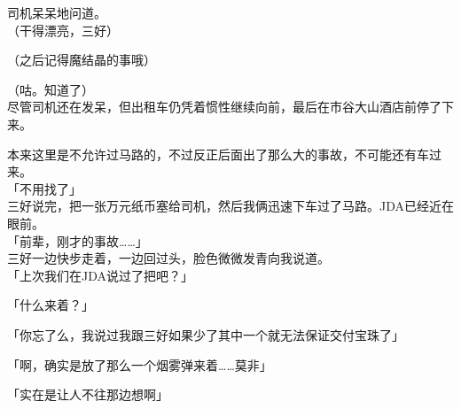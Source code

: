 司机呆呆地问道。\\

（干得漂亮，三好）

（之后记得魔结晶的事哦）

（咕。知道了）\\

尽管司机还在发呆，但出租车仍凭着惯性继续向前，最后在市谷大山酒店前停了下来。

本来这里是不允许过马路的，不过反正后面出了那么大的事故，不可能还有车过来。\\

「不用找了」\\

三好说完，把一张万元纸币塞给司机，然后我俩迅速下车过了马路。JDA已经近在眼前。\\

「前辈，刚才的事故……」\\

三好一边快步走着，一边回过头，脸色微微发青向我说道。\\

「上次我们在JDA说过了把吧？」

「什么来着？」

「你忘了么，我说过我跟三好如果少了其中一个就无法保证交付宝珠了」

「啊，确实是放了那么一个烟雾弹来着……莫非」

「实在是让人不往那边想啊」\\

